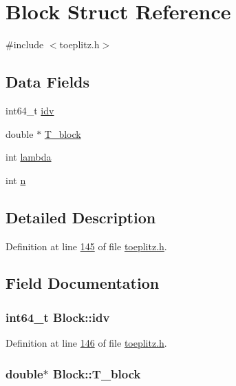 \hypertarget{structBlock}{\section{Block Struct Reference}
\label{structBlock}
}


{\ttfamily \#include $<$toeplitz.\-h$>$}

\subsection*{Data Fields}
\begin{DoxyCompactItemize}
\item 
int64\-\_\-t \hyperlink{structBlock_ad45697f62720768c82b652d948156fc6}{idv}
\item 
double $\ast$ \hyperlink{structBlock_a79bef249b5532406d73f2c5253e00a60}{T\-\_\-block}
\item 
int \hyperlink{structBlock_a8f25504e415ca086e0bcaf30b676f29f}{lambda}
\item 
int \hyperlink{structBlock_a458266f4280fecec415e23faf8a043a8}{n}
\end{DoxyCompactItemize}


\subsection{Detailed Description}


Definition at line \hyperlink{toeplitz_8h_source_l00145}{145} of file \hyperlink{toeplitz_8h_source}{toeplitz.\-h}.



\subsection{Field Documentation}
\hypertarget{structBlock_ad45697f62720768c82b652d948156fc6}{
\subsubsection[{idv}]{\setlength{\rightskip}{0pt plus 5cm}int64\-\_\-t Block\-::idv}}\label{structBlock_ad45697f62720768c82b652d948156fc6}


Definition at line \hyperlink{toeplitz_8h_source_l00146}{146} of file \hyperlink{toeplitz_8h_source}{toeplitz.\-h}.

\hypertarget{structBlock_a79bef249b5532406d73f2c5253e00a60}{
\subsubsection[{T\-\_\-block}]{\setlength{\rightskip}{0pt plus 5cm}double$\ast$ Block\-::\-T\-\_\-block}}\label{structBlock_a79bef249b5532406d73f2c5253e00a60}


